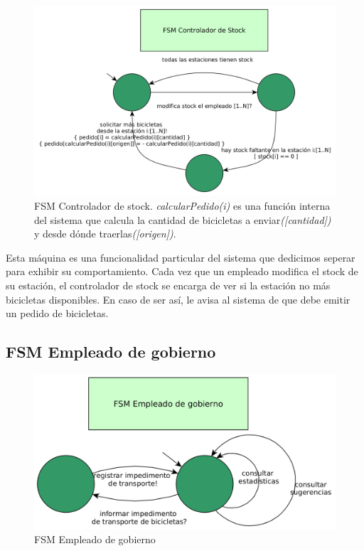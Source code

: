 \begin{figure}[H]
	\centering
	\includegraphics[scale=0.4]{imgs/fsm_controlador_stock.png}
	\caption{FSM Controlador de stock. \emph{calcularPedido(i)} es una funci\'on interna del sistema que calcula la cantidad de bicicletas a enviar\emph{([cantidad])} y desde d\'onde traerlas\emph{([origen])}.}
\end{figure}

Esta m\'aquina es una funcionalidad particular del sistema que dedicimos seperar para exhibir su comportamiento. Cada vez que un empleado modifica el stock de su estaci\'on, el controlador de stock se encarga de ver si la estaci\'on no m\'as bicicletas disponibles. En caso de ser as\'i, le avisa al sistema de que debe emitir un pedido de bicicletas. 

\subsection{FSM Empleado de gobierno}

\begin{figure}[H]
	\centering
	\includegraphics[scale=0.4]{imgs/fsm_empleado_gobierno.png}
	\caption{FSM Empleado de gobierno}
\end{figure}

